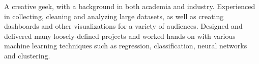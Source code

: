 A creative geek, with a background in both academia and industry. Experienced in collecting, cleaning and analyzing large datasets, as well as creating dashboards and other visualizations for a variety of audiences. Designed and delivered many loosely-defined projects and worked hands on with various machine learning techniques such as regression, classification, neural networks and clustering.
